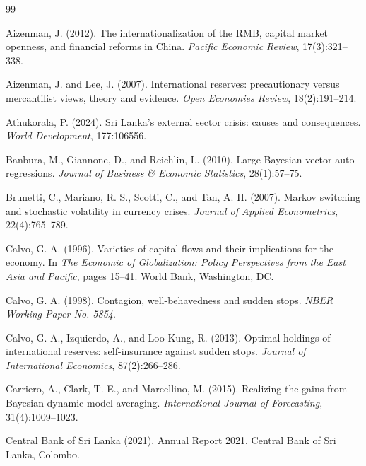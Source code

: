 \documentclass[12pt,a4paper]{article}
\begin{document}

\begin{thebibliography}{99}

Aizenman, J. (2012).
\newblock The internationalization of the RMB, capital market openness, and financial reforms in China.
\newblock \textit{Pacific Economic Review}, 17(3):321--338.

Aizenman, J. and Lee, J. (2007).
\newblock International reserves: precautionary versus mercantilist views, theory and evidence.
\newblock \textit{Open Economies Review}, 18(2):191--214.

Athukorala, P. (2024).
\newblock Sri Lanka's external sector crisis: causes and consequences.
\newblock \textit{World Development}, 177:106556.

Banbura, M., Giannone, D., and Reichlin, L. (2010).
\newblock Large Bayesian vector auto regressions.
\newblock \textit{Journal of Business \& Economic Statistics}, 28(1):57--75.

Brunetti, C., Mariano, R. S., Scotti, C., and Tan, A. H. (2007).
\newblock Markov switching and stochastic volatility in currency crises.
\newblock \textit{Journal of Applied Econometrics}, 22(4):765--789.

Calvo, G. A. (1996).
\newblock Varieties of capital flows and their implications for the economy.
\newblock In \textit{The Economic of Globalization: Policy Perspectives from the East Asia and Pacific}, pages 15--41. World Bank, Washington, DC.

Calvo, G. A. (1998).
\newblock Contagion, well-behavedness and sudden stops.
\newblock \textit{NBER Working Paper No. 5854}.

Calvo, G. A., Izquierdo, A., and Loo-Kung, R. (2013).
\newblock Optimal holdings of international reserves: self-insurance against sudden stops.
\newblock \textit{Journal of International Economics}, 87(2):266--286.

Carriero, A., Clark, T. E., and Marcellino, M. (2015).
\newblock Realizing the gains from Bayesian dynamic model averaging.
\newblock \textit{International Journal of Forecasting}, 31(4):1009--1023.

Central Bank of Sri Lanka (2021).
\newblock Annual Report 2021.
\newblock Central Bank of Sri Lanka, Colombo.


\end{thebibliography}
\end{document}
